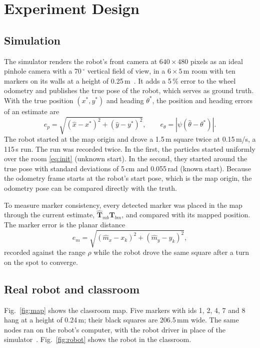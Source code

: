 \documentclass[conference]{IEEEtran}
\newcommand{\vect}[1]{\boldsymbol{#1}}
\begin{document}
\section{Experiment Design}
\label{sec:experiment}

\subsection{Simulation}
The simulator renders the robot's front camera at $640 \times 480$ pixels as an ideal pinhole camera with a 70\,$^\circ$ vertical field of view, in a $6 \times 5$\,m room with ten markers on its walls at a height of 0.25\,m~\cite{for26}. It adds a 5\,\% error to the wheel odometry and publishes the true pose of the robot, which serves as ground truth. With the true position $(x^*, y^*)$ and heading $\theta^*$, the position and heading errors of an estimate are
\begin{equation}
e_p = \sqrt{(\hat{x} - x^*)^2 + (\hat{y} - y^*)^2}, \qquad
e_\theta = \left| \psi(\hat{\theta} - \theta^*) \right|.
\label{eq:poserror}
\end{equation}
The robot started at the map origin and drove a 1.5\,m square twice at 0.15\,m/s, a 115\,s run. The run was recorded twice. In the first, the particles started uniformly over the room \eqref{eq:init} (unknown start). In the second, they started around the true pose with standard deviations of 5\,cm and 0.055\,rad (known start). Because the odometry frame starts at the robot's start pose, which is the map origin, the odometry pose can be compared directly with the truth.

To measure marker consistency, every detected marker was placed in the map through the current estimate, $\hat{\vect{T}}_{mb} \vect{T}_{bm}$, and compared with its mapped position. The marker error is the planar distance
\begin{equation}
e_m = \sqrt{(\hat{m}_x - x_k)^2 + (\hat{m}_y - y_k)^2},
\label{eq:markererror}
\end{equation}
recorded against the range $\rho$ while the robot drove the same square after a turn on the spot to converge.

\subsection{Real robot and classroom}
Fig.~\ref{fig:map} shows the classroom map. Five markers with ids 1, 2, 4, 7 and 8 hang at a height of 0.24\,m; their black squares are 206.5\,mm wide. The same nodes ran on the robot's computer, with the robot driver in place of the simulator~\cite{for26,lerobot}. Fig.~\ref{fig:robot} shows the robot in the classroom.
\end{document}
